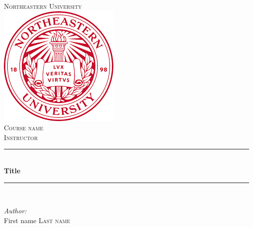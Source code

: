 \documentclass[12pt]{article}
\begin{document}
\begin{titlepage}

\newcommand{\HRule}{\rule{\linewidth}{0.5mm}} %

\center %
 

\textsc{\LARGE Northeastern University}\\[1.5cm] 
\includegraphics[scale=.7]{Northeastern University Logo.png}\\[2cm] %
\textsc{\Large Course name}\\[0.5cm] %
\textsc{\large Instructor}\\[0.5cm] %


\HRule \\[0.4cm]
{ \huge \bfseries Title}\\[0.4cm] %
\HRule \\[1.5cm]
 

\begin{minipage}{0.4\textwidth}
\begin{center} \large
\emph{Author:}\\
First name \textsc{Last name}\\ %
\end{center}


\end{minipage}
\end{titlepage}
\end{document}
